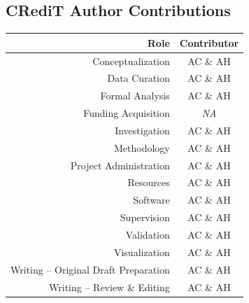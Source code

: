 \documentclass[man, floatsintext]{apa7}
\begin{document}
\subsection{CRediT Author Contributions}
\begin{table}[H]
\begin{tabular}{r|c}
Role                  &     Contributor    \\
\hline
Conceptualization                  &  AC \& AH \\
Data Curation                    & AC \& AH \\
Formal Analysis                     &  AC \& AH \\
Funding Acquisition                  & \textit{NA}       \\
Investigation                      &  AC \& AH \\
Methodology                         &  AC \& AH \\
Project Administration               &  AC \& AH \\
Resources                           &  AC \& AH \\
Software                             &  AC \& AH \\
Supervision                          &  AC \& AH \\
Validation                           &  AC \& AH \\
Visualization                        &   AC \& AH \\
Writing – Original Draft Preparation &   AC \& AH \\
Writing – Review \& Editing          &  AC \& AH
\end{tabular}
\end{table}

\color{black}

 

\end{document}
